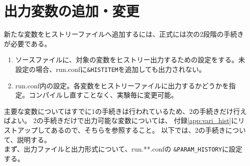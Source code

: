 \section{出力変数の追加・変更}
\label{sec:output}
新たな変数をヒストリーファイルへ追加するには、正式には次の2段階の手続きが必要である。

\begin{enumerate}
\item ソースファイルに、対象の変数をヒストリー出力するための設定をする。未設定の場合、run.confに\verb|&HISTITEM|を追加しても出力されない。
\item run.conf内の設定。各変数をヒストリーファイルに出力するかどうかを指定。コンパイルし直すことなく、実験毎に変更可能。
\end{enumerate}
主要な変数についてはすでに1の手続きは行われているため、2の手続きだけ行えばよい。
2の手続きだけで出力可能な変数については、
付録\ref{app:vari_hist}にリストアップしてあるので、そちらを参照すること。
以下では、2の手続きについて、説明する。\\

まず、出力ファイルと出力形式について、run.**.confの
\verb|&PARAM_HISTORY|に設定する。\\

\\

